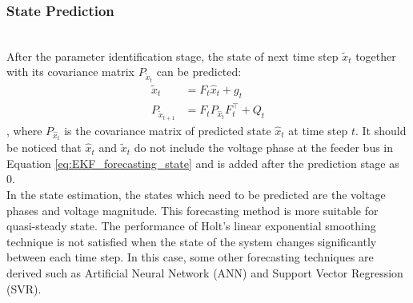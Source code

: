 \subsubsection{State Prediction}
\\After the parameter identification stage, the state of next time step $\widetilde{x}_t$ together with its covariance matrix $P_{\widetilde{x}_t}$ can be predicted:
\begin{align}
    \widetilde{x}_t &= F_t \hat{x}_t +g_t \label{eq:EKF_forecasting_state}
    \\[1pt]
    P_{\widetilde{x}_{t+1}} &= F_t P_{\hat{x}_t} F_t^\intercal +Q_t 
    \label{eq:EKF_forecasting_state_covariance_matrix}
\end{align}
, where $P_{\hat{x}_t}$ is the covariance matrix of predicted state $\hat{x}_t$ at time step $t$. It should be noticed that  $\hat{x}_t$ and $\widetilde{x}_t$ do not include the voltage phase at the feeder bus in Equation \ref{eq:EKF_forecasting_state} and is added after the prediction stage as 0.
\bigskip
 \\In the state estimation, the states which need to be predicted are the voltage phases and voltage magnitude. This forecasting method is more suitable for quasi-steady state. The performance of Holt's linear exponential smoothing technique is not satisfied when the state of the system changes significantly between each time step. In this case, some other forecasting techniques are derived such as Artificial Neural Network (ANN) and Support Vector Regression (SVR).


